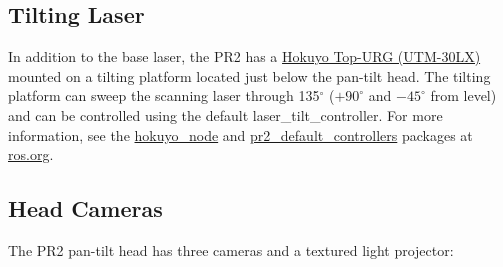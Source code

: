 \subsection{Tilting Laser}
\label{tilting laser}
In addition to the base laser, the PR2 has a
\href{http://www.hokuyo-aut.jp/02sensor/07scanner/utm_30lx.html}{Hokuyo Top-URG
  (UTM-30LX)} mounted on a tilting platform located just below the pan-tilt
head. The tilting platform can sweep the scanning laser through 135$^\circ$
($+90^\circ$ and $-45^\circ$ from level) and can be controlled using the default
laser\_tilt\_controller. For more information, see the
\href{http://www.ros.org/wiki/hokuyo_node}{hokuyo\_node} and
\href{http://www.ros.org/wiki/pr2_default_controllers}{pr2\_default\_controllers}
packages at \href{http://www.ros.org}{ros.org}.

\subsection{Head Cameras}
The PR2 pan-tilt head has three cameras and a textured light projector:
